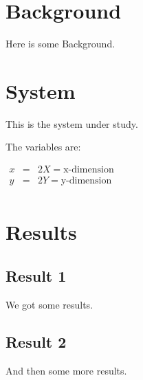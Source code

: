 \documentclass{article}
\begin{document}
\section{Background}\label{sec:background}

Here is some Background.

\section{System}\label{sec:system}

This is the system under study.

The variables are:

$\begin{array}{rcl}
x & = & 2 X =\text{x-dimension} \\
y & = & 2 Y =\text{y-dimension} \\
\end{array}$

\section{Results}

\subsection{Result 1}\label{subsec:res1}

We got some results.

\subsection{Result 2}\label{subsec:res2}

And then some more results.
\end{document}
